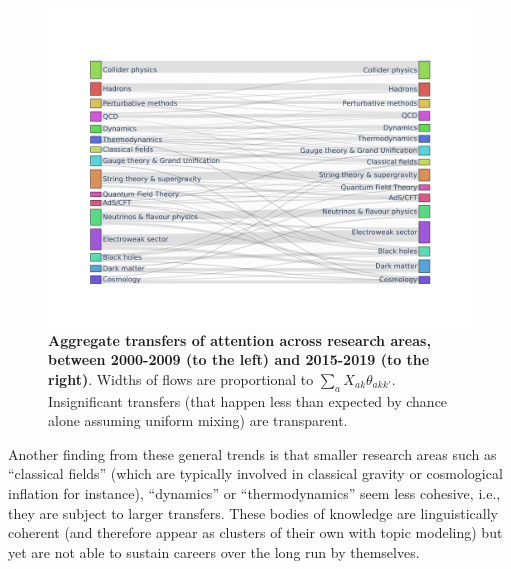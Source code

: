\documentclass{article}
\begin{document}
 \begin{figure}[h]
     \centering
     \includegraphics[width=\textwidth]{plots/sankey_control_nu.pdf}
     \caption{\textbf{Aggregate transfers of attention across research areas, between 2000-2009 (to the left) and 2015-2019 (to the right)}. Widths of flows are proportional to $\sum_a X_{ak}\theta_{akk'}$. Insignificant transfers (that happen less than expected by chance alone assuming uniform mixing) are transparent. }
     \label{fig:sankey}
 \end{figure}

Another finding from these general trends is that smaller research areas such as ``classical fields'' (which are typically involved in classical gravity or cosmological inflation for instance), ``dynamics'' or ``thermodynamics'' seem less cohesive, i.e., they are subject to larger transfers. These bodies of knowledge are linguistically coherent (and therefore appear as clusters of their own with topic modeling) but yet are not able to sustain careers over the long run by themselves.
\end{document}
